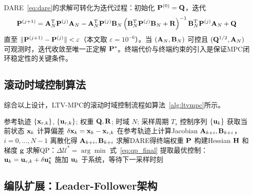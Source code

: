 DARE~\eqref{eq:dare}的求解可转化为迭代过程：初始化 $\mathbf{P}^{(0)} = \mathbf{Q}$，迭代
\begin{equation}\label{eq:dare_iter}
\mathbf{P}^{(j+1)} = \mathbf{A}_N^{\mathrm{T}} \mathbf{P}^{(j)} \mathbf{A}_N - \mathbf{A}_N^{\mathrm{T}} \mathbf{P}^{(j)} \mathbf{B}_N \left(\mathbf{B}_N^{\mathrm{T}} \mathbf{P}^{(j)} \mathbf{B}_N + \mathbf{R}\right)^{-1} \mathbf{B}_N^{\mathrm{T}} \mathbf{P}^{(j)} \mathbf{A}_N + \mathbf{Q}
\end{equation}
直至 $\|\mathbf{P}^{(j+1)} - \mathbf{P}^{(j)}\| < \varepsilon$（本文取 $\varepsilon = 10^{-6}$）。当 $(\mathbf{A}_N, \mathbf{B}_N)$ 可控且 $(\mathbf{Q}^{1/2}, \mathbf{A}_N)$ 可观测时，迭代收敛至唯一正定解 $\mathbf{P}^*$\cite{Anderson1990}。终端代价与终端约束的引入是保证MPC闭环稳定性的关键条件\cite{Mayne2000,Scokaert1999}。

\subsection{滚动时域控制算法}

综合以上设计，LTV-MPC的滚动时域控制流程如算法~\ref{alg:ltvmpc}所示。

\begin{algorithm}[htbp]
\caption{LTV-MPC滚动时域控制}\label{alg:ltvmpc}
\begin{algorithmic}[1]
\Require 参考轨迹 $\{\mathbf{x}_{r,k}\}$, $\{\mathbf{u}_{r,k}\}$; 权重 $\mathbf{Q}, \mathbf{R}$; 时域 $N$; 采样周期 $T_s$
\Ensure 控制序列 $\{\mathbf{u}_k\}$
    \State 获取当前状态 $\mathbf{x}_k$
    \State 计算偏差 $\delta\mathbf{x}_k = \mathbf{x}_k - \mathbf{x}_{r,k}$
    \State 在参考轨迹上计算Jacobian $\mathbf{A}_{k+i}, \mathbf{B}_{k+i}$，$i=0,\ldots,N-1$ 
    \State 离散化得 $\mathbf{A}_{k+i}, \mathbf{B}_{k+i}$ 
    \State 求解DARE得终端权重 $\mathbf{P}$ 
    \State 构建Hessian $\mathbf{H}$ 和梯度 $\mathbf{g}$ 
    \State 求解QP：$\Delta\mathcal{U}^* = \arg\min$ 式~\eqref{eq:qp_final}
    \State 提取最优控制：$\mathbf{u}_k = \mathbf{u}_{r,k} + \delta\mathbf{u}_k^*$
    \State 施加 $\mathbf{u}_k$ 于系统，等待下一采样时刻
\EndFor
\end{algorithmic}
\end{algorithm}

\subsection{编队扩展：Leader-Follower架构}\label{sec:formation}

